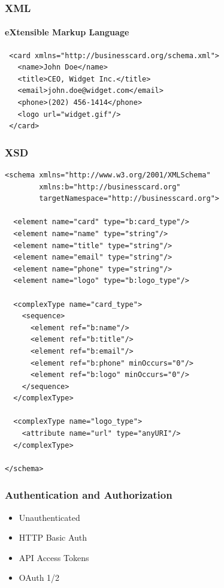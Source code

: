 \documentclass{beamer}
\begin{document}
\begin{frame}[fragile=singleslide]
	\frametitle{XML}
	\framesubtitle{eXtensible Markup Language}
	\begin{Verbatim}
 <card xmlns="http://businesscard.org/schema.xml">
   <name>John Doe</name>
   <title>CEO, Widget Inc.</title>
   <email>john.doe@widget.com</email>
   <phone>(202) 456-1414</phone>
   <logo url="widget.gif"/>
 </card>
	\end{Verbatim}
\end{frame}


\begin{frame}[fragile=singleslide]
  \frametitle{XSD}
  {\tiny
  \begin{Verbatim}
<schema xmlns="http://www.w3.org/2001/XMLSchema"
        xmlns:b="http://businesscard.org"
        targetNamespace="http://businesscard.org">

  <element name="card" type="b:card_type"/>
  <element name="name" type="string"/>
  <element name="title" type="string"/>
  <element name="email" type="string"/>
  <element name="phone" type="string"/>
  <element name="logo" type="b:logo_type"/>

  <complexType name="card_type">
    <sequence>
      <element ref="b:name"/>
      <element ref="b:title"/>
      <element ref="b:email"/>
      <element ref="b:phone" minOccurs="0"/>
      <element ref="b:logo" minOccurs="0"/>
    </sequence>
  </complexType>

  <complexType name="logo_type">
    <attribute name="url" type="anyURI"/>
  </complexType>

</schema>
  \end{Verbatim}
}
\end{frame}


\begin{frame}
  \frametitle{Authentication and Authorization}
  \begin{itemize}
    \item Unauthenticated
    \item HTTP Basic Auth
    \item API Access Tokens
    \item OAuth 1/2
  \end{itemize}
\end{frame}
\end{document}
